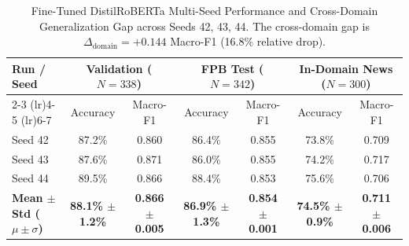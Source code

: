 \begin{table}[t]
\centering
\small
\caption{Fine-Tuned DistilRoBERTa Multi-Seed Performance and Cross-Domain Generalization Gap across Seeds 42, 43, 44. The cross-domain gap is $\Delta_{\text{domain}} = +0.144$ Macro-F1 (16.8\% relative drop).}
\label{tab:multiseed}
\begin{tabular}{lcccccc}
\toprule
\textbf{Run / Seed} & \multicolumn{2}{c}{\textbf{Validation ($N=338$)}} & \multicolumn{2}{c}{\textbf{FPB Test ($N=342$)}} & \multicolumn{2}{c}{\textbf{In-Domain News ($N=300$)}} \\
\cmidrule(lr){2-3} \cmidrule(lr){4-5} \cmidrule(lr){6-7}
& Accuracy & Macro-F1 & Accuracy & Macro-F1 & Accuracy & Macro-F1 \\
\midrule
Seed 42 & 87.2\% & 0.860 & 86.4\% & 0.855 & 73.8\% & 0.709 \\
Seed 43 & 87.6\% & 0.871 & 86.0\% & 0.855 & 74.2\% & 0.717 \\
Seed 44 & 89.5\% & 0.866 & 88.4\% & 0.853 & 75.6\% & 0.706 \\
\midrule
\textbf{Mean $\pm$ Std ($\mu \pm \sigma$)} & \textbf{88.1\% $\pm$ 1.2\%} & \textbf{0.866 $\pm$ 0.005} & \textbf{86.9\% $\pm$ 1.3\%} & \textbf{0.854 $\pm$ 0.001} & \textbf{74.5\% $\pm$ 0.9\%} & \textbf{0.711 $\pm$ 0.006} \\
\bottomrule
\end{tabular}
\end{table}